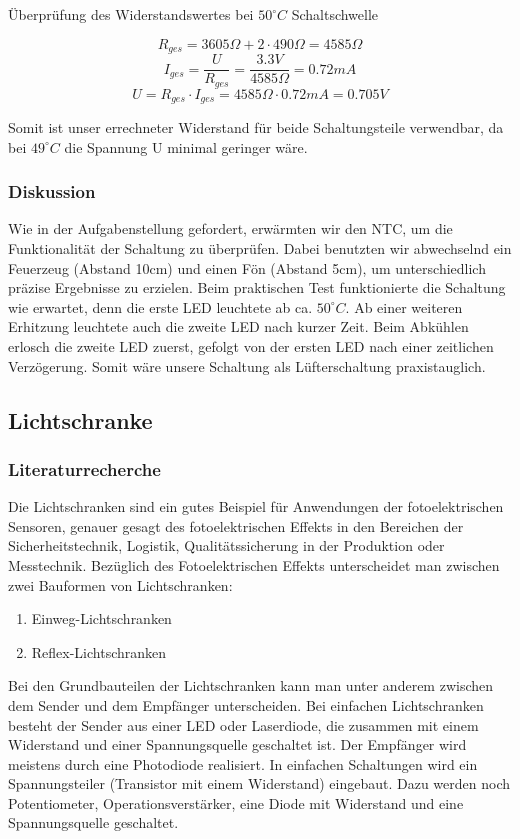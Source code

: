 \noindent
Überprüfung des Widerstandswertes bei $50^{\circ} C$ Schaltschwelle

\[ R_{ges} = 3605 \Omega + 2 \cdot 490 \Omega = 4585 \Omega \]
\[ I_{ges} = \frac{U}{R_{ges}} = \frac{3.3 V}{4585 \Omega} = 0.72 mA \]
\[ U = R_{ges} \cdot I_{ges} = 4585 \Omega \cdot 0.72 mA = 0.705 V \]

\noindent
Somit ist unser errechneter Widerstand für beide Schaltungsteile verwendbar, da bei $49^{\circ} C$ die Spannung U minimal geringer wäre.

\subsubsection{Diskussion}

Wie in der Aufgabenstellung gefordert, erwärmten wir den NTC, um die Funktionalität der Schaltung zu überprüfen. Dabei benutzten wir abwechselnd ein Feuerzeug (Abstand 10cm) und einen Fön (Abstand 5cm), um unterschiedlich präzise Ergebnisse zu erzielen. Beim praktischen Test funktionierte die Schaltung wie erwartet, denn die erste LED leuchtete ab ca. $50^{\circ} C$. Ab einer weiteren Erhitzung leuchtete auch die zweite LED nach kurzer Zeit. Beim Abkühlen erlosch die zweite LED zuerst, gefolgt von der ersten LED nach einer zeitlichen Verzögerung. Somit wäre unsere Schaltung als Lüfterschaltung praxistauglich.


\newpage
\subsection{Lichtschranke}

\subsubsection{Literaturrecherche}

Die Lichtschranken sind ein gutes Beispiel für Anwendungen der fotoelektrischen Sensoren, genauer gesagt des fotoelektrischen Effekts in den Bereichen der Sicherheitstechnik, Logistik, Qualitätssicherung in der Produktion oder Messtechnik. Bezüglich des Fotoelektrischen Effekts unterscheidet man zwischen zwei Bauformen von Lichtschranken: \cite{sensorik} \cite{optische}
\begin{enumerate}
\item Einweg-Lichtschranken
\item Reflex-Lichtschranken
\end{enumerate}

\noindent
Bei den Grundbauteilen der Lichtschranken kann man unter anderem zwischen dem Sender und dem Empfänger unterscheiden. Bei einfachen Lichtschranken besteht der Sender aus einer LED oder Laserdiode, die zusammen mit einem Widerstand und einer  Spannungsquelle geschaltet ist. Der Empfänger wird meistens durch eine Photodiode realisiert. In einfachen Schaltungen wird ein Spannungsteiler (Transistor mit einem Widerstand) eingebaut. Dazu werden noch Potentiometer, Operationsverstärker, eine Diode mit Widerstand und eine Spannungsquelle geschaltet. \cite{schaltung_licht}

